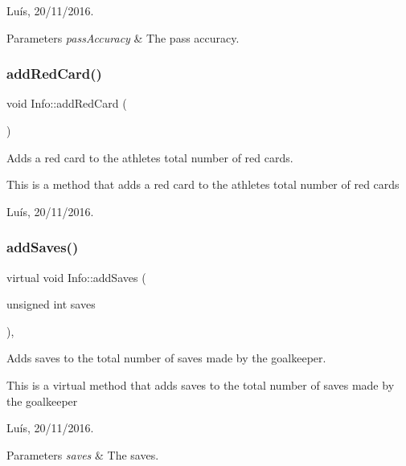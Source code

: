 Luís, 20/11/2016. 


\begin{DoxyParams}{Parameters}
{\em pass\+Accuracy} & The pass accuracy. \\
\hline
\end{DoxyParams}
\hypertarget{class_info_acbfe3707047b1a4f7b9b8442797cbaa3}{}\label{class_info_acbfe3707047b1a4f7b9b8442797cbaa3} 
\subsubsection{\texorpdfstring{add\+Red\+Card()}{addRedCard()}}
{\footnotesize\ttfamily void Info\+::add\+Red\+Card (\begin{DoxyParamCaption}{ }\end{DoxyParamCaption})}



Adds a red card to the athlete\textquotesingle{}s total number of red cards. 

This is a method that adds a red card to the athlete\textquotesingle{}s total number of red cards

Luís, 20/11/2016. \hypertarget{class_info_a7e66fc93d6ab97827bbf50fa61c71186}{}\label{class_info_a7e66fc93d6ab97827bbf50fa61c71186} 
\subsubsection{\texorpdfstring{add\+Saves()}{addSaves()}}
{\footnotesize\ttfamily virtual void Info\+::add\+Saves (\begin{DoxyParamCaption}\item[{unsigned int}]{saves }\end{DoxyParamCaption})\hspace{0.3cm}{\ttfamily [inline]}, {\ttfamily [virtual]}}



Adds saves to the total number of saves made by the goalkeeper. 

This is a virtual method that adds saves to the total number of saves made by the goalkeeper

Luís, 20/11/2016. 


\begin{DoxyParams}{Parameters}
{\em saves} & The saves. \\
\hline
\end{DoxyParams}


